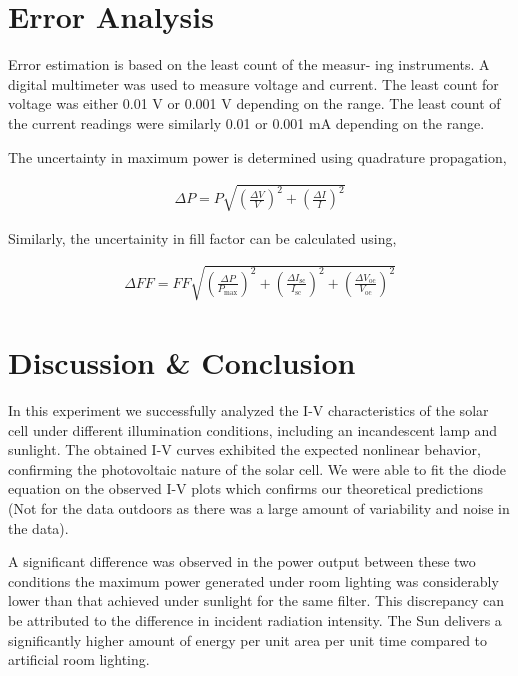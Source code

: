 \section{Error Analysis}

Error estimation is based on the least count of the measur-
ing instruments. A digital multimeter was used to measure
voltage and current. The least count for voltage was either 0.01 V or 0.001 V depending on the range. The least count of the current readings were similarly 0.01 or 0.001 mA depending on the range.

The uncertainty in maximum power is determined using quadrature propagation,

\begin{align}
    \Delta P = P \sqrt{\left(\frac{\Delta V}{V}\right)^2 + \left(\frac{\Delta I}{I}\right)^2}
\end{align}

Similarly, the uncertainity in fill factor can be calculated using,

\begin{align}
    \Delta FF = FF \sqrt{\left(\frac{\Delta P}{P_\text{max}}\right)^2 + \left(\frac{\Delta I_\text{sc}}{I_\text{sc}}\right)^2 + \left(\frac{\Delta V_\text{oc}}{V_\text{oc}}\right)^2}
\end{align}

\section{Discussion \& Conclusion}

In this experiment we successfully analyzed the I-V characteristics of the solar cell under different illumination conditions, including an incandescent lamp and sunlight. The
obtained I-V curves exhibited the expected nonlinear behavior, confirming the photovoltaic nature of the solar
cell. We were able to fit the diode equation on the observed I-V plots which confirms our theoretical predictions (Not for the data outdoors as there was a large amount of variability and noise in the data).

A significant difference was observed in the power output
between these two conditions the maximum power generated under room lighting was considerably lower than
that achieved under sunlight for the same filter.
This discrepancy can be attributed to the difference in
incident radiation intensity. The Sun delivers a significantly higher amount of energy per unit area per
unit time compared to artificial room lighting.

